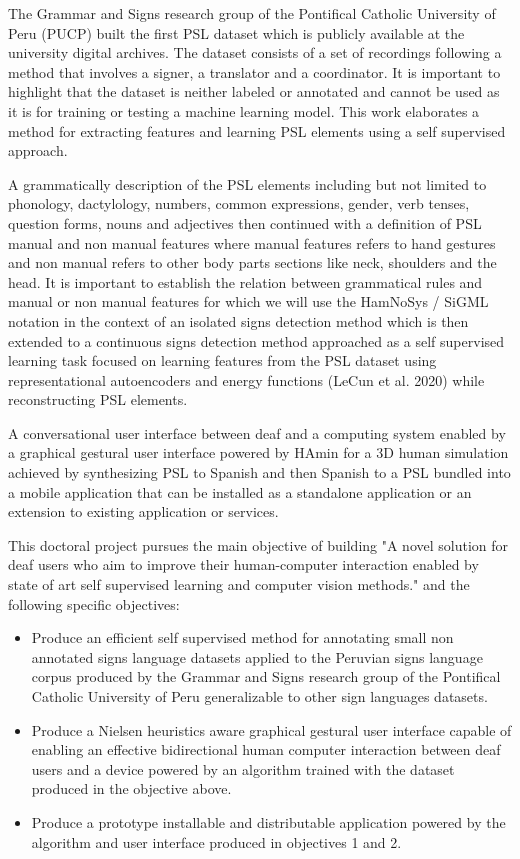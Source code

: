 The Grammar and Signs research group of the Pontifical Catholic University of Peru (PUCP) built the first PSL dataset  which is publicly available at the university digital archives. The dataset consists of a set of recordings following a method that involves a signer, a translator and a coordinator. It is important to highlight that the dataset is neither labeled or annotated and cannot be used as it is for training or testing a machine learning model. This work elaborates a method for extracting features and learning PSL elements using a self supervised approach.

A grammatically description of the PSL elements including but not limited to phonology, dactylology, numbers, common expressions, gender, verb tenses, question forms, nouns and adjectives then continued with a definition of PSL manual and non manual features where manual features refers to hand gestures and non manual refers to other body parts sections like neck, shoulders and the head. It is important to establish the relation between grammatical rules and manual or non manual features for which we will use the HamNoSys / SiGML notation in the context of an isolated signs detection method which is then extended to a continuous signs detection method approached as a self supervised learning task focused on learning features from the PSL dataset using representational autoencoders and energy functions (LeCun et al. 2020) while reconstructing PSL elements.

A conversational user interface between deaf and a computing system enabled by a graphical gestural user interface powered by HAmin for a 3D human simulation achieved by synthesizing PSL to Spanish and then Spanish to a PSL bundled into a mobile application that can be installed as a standalone application or an extension to existing application or services.

This doctoral project pursues the main objective of building "A novel solution for deaf users who aim to improve their human-computer interaction enabled by state of art self supervised learning and computer vision methods." and the following specific objectives:

\begin{itemize}
\item Produce an efficient self supervised method for annotating small non annotated signs language datasets applied to the Peruvian signs language corpus produced by the Grammar and Signs research group of the Pontifical Catholic University of Peru generalizable to other sign languages datasets.
\item Produce a Nielsen heuristics aware graphical gestural user interface capable of enabling an effective bidirectional human computer interaction between deaf users and a device powered by an algorithm trained with the dataset produced in the objective above.
\item Produce a prototype installable and distributable application powered by the algorithm and user interface produced in objectives 1 and 2.
\end{itemize}


